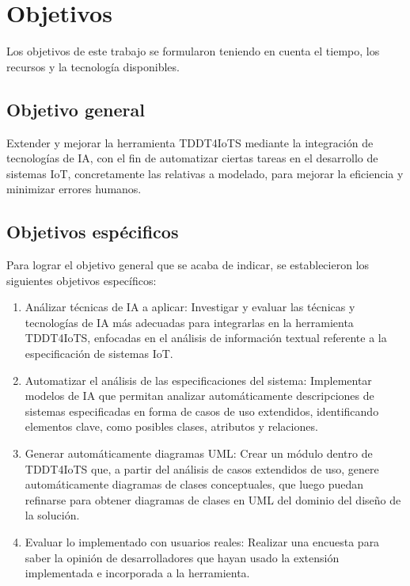 \section{Objetivos}\label{section:objetivos}

Los objetivos de este trabajo se formularon teniendo en cuenta el tiempo, los recursos y la tecnología disponibles.

\subsection{Objetivo general}

Extender y mejorar la herramienta TDDT4IoTS mediante la integración de tecnologías de IA, con el fin de automatizar ciertas tareas en el desarrollo de sistemas IoT, concretamente las relativas a modelado, para mejorar la eficiencia y minimizar errores humanos.

\subsection{Objetivos espécificos}

Para lograr el objetivo general que se acaba de indicar, se establecieron los siguientes objetivos específicos:

\begin{enumerate}
	\item Análizar técnicas de IA a aplicar: Investigar y evaluar las técnicas y tecnologías de IA más adecuadas para integrarlas en la herramienta TDDT4IoTS, enfocadas en el análisis de información textual referente a la especificación de sistemas IoT.
	
	\item Automatizar el análisis de las especificaciones del sistema: Implementar modelos de IA que permitan analizar automáticamente descripciones de sistemas especificadas en forma de casos de uso extendidos, identificando elementos clave, como posibles clases, atributos y relaciones.
	
	\item Generar automáticamente diagramas UML: Crear un módulo dentro de TDDT4IoTS que, a partir del análisis de casos extendidos de uso, genere automáticamente diagramas de clases conceptuales, que luego puedan refinarse para obtener diagramas de clases en UML del dominio del diseño de la solución.
	
	\item Evaluar lo implementado con usuarios reales: Realizar una encuesta para saber la opinión de desarrolladores que hayan usado la extensión implementada e incorporada a la herramienta.

\end{enumerate}